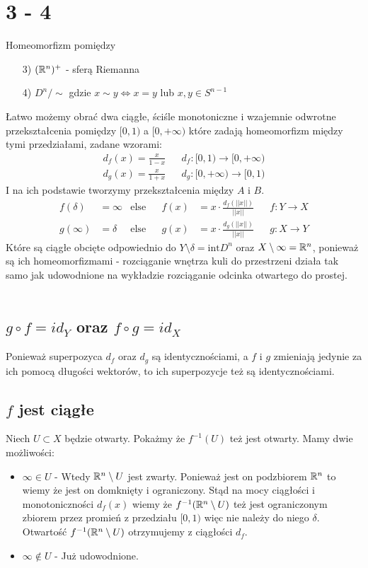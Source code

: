 \newpage
\section*{3 - 4}
Homeomorfizm pomiędzy
\begin{itemize}
  \item[3)] $({\mathbb{R}}^n)^+$ - sferą Riemanna
  \item[4)] $D ^ {n} / \sim $ gdzie $ x \sim y \iff x = y $ lub $ x, y \in S^{n-1} $
\end{itemize}
Łatwo możemy obrać dwa ciągłe, ściśle monotoniczne i wzajemnie odwrotne przekształcenia pomiędzy $[0, 1)$ a $[0, +\infty)$ które zadają homeomorfizm między tymi przedziałami, zadane wzorami:
\begin{align*}
  d_f(x) = \tfrac{x}{1 - x} & & d_f : [0, 1) \to [0, +\infty) \\
  d_g(x) = \tfrac{x}{1 + x} & & d_g : [0, +\infty) \to [0, 1)
\end{align*}
I na ich podstawie tworzymy przekształcenia między $A$ i $B$.
\begin{align*}
  f(\delta) &= \infty & \text{else} & & f(x) &= x \cdot \tfrac{d_f(||x||)}{||x||} & & f : Y \to X \\
  g(\infty) &= \delta & \text{else} & & g(x) &= x \cdot \tfrac{d_g(||x||)}{||x||} & & g : X \to Y
\end{align*}
Które są ciągłe obcięte odpowiednio do $ Y \setminus \delta =  \text{int}{D^n}$ oraz $X \setminus \infty = {\mathbb{R}}^n$, ponieważ są ich homeomorfizmami - rozciąganie wnętrza kuli do przestrzeni działa tak samo jak udowodnione na wykładzie rozciąganie odcinka otwartego do prostej. \\
\\
\subsection*{$g \circ f = id_Y$ oraz $f \circ g = id_X$}
Ponieważ superpozyca $d_f$ oraz $d_g$ są identycznościami, a $f$ i $g$ zmieniają jedynie za ich pomocą długości wektorów, to ich superpozycje też są identycznościami.
\subsection*{$f$ jest ciągłe}
Niech $ U \subset X$ będzie otwarty. Pokażmy że $f^{-1}(U)$ też jest otwarty. Mamy dwie możliwości:
\begin{itemize}
  \item $\infty \in U$ - Wtedy ${\mathbb{R}}^n \setminus U$ jest zwarty. Ponieważ jest on podzbiorem ${\mathbb{R}}^n$ to wiemy że jest on domknięty i ograniczony. Stąd na mocy ciągłości i monotoniczności $d_f(x)$ wiemy że $f^{-1}({\mathbb{R}}^n \setminus U)$ też jest ograniczonym zbiorem przez promień z przedziału $[0,1)$ więc nie należy do niego $\delta$. Otwartość $f^{-1}({\mathbb{R}}^n \setminus U)$ otrzymujemy z ciągłości $d_f$.
  \item $\infty \not \in U$ - Już udowodnione.
\end{itemize}
